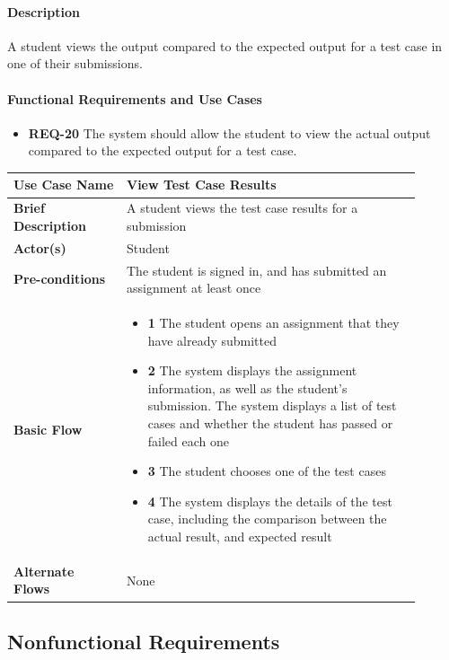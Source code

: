 \documentclass{article}
\begin{document}
\paragraph{Description} A student views the output compared to the expected output for a test case in one of their submissions.

\paragraph{Functional Requirements and Use Cases}

\begin{itemize}
  \item \textbf{REQ-20} The system should allow the student to view the actual output compared to the expected output for a test case.
\end{itemize}

\begin{tabular}{| p{0.25\linewidth} | p{0.65\linewidth} |}
  \hline
  \textbf{Use Case Name} & View Test Case Results\\
  \hline
  \textbf{Brief Description} & A student views the test case results for a submission\\
  \hline
  \textbf{Actor(s)} & Student \\
  \hline
  \textbf{Pre-conditions} & The student is signed in, and has submitted an assignment at least once\\
  \hline
  \textbf{Basic Flow} & \begin{itemize}
    \item[] \textbf{1} The student opens an assignment that they have already submitted
    \item[] \textbf{2} The system displays the assignment information, as well as the student's submission. The system displays a list of test cases and whether the student has passed or failed each one
    \item[] \textbf{3} The student chooses one of the test cases
    \item[] \textbf{4} The system displays the details of the test case, including the comparison between the actual result, and expected result
  \end{itemize}\\
  \hline
  \textbf{Alternate Flows} & None\\
  \hline
\end{tabular}

\subsection{Nonfunctional Requirements}
\end{document}
